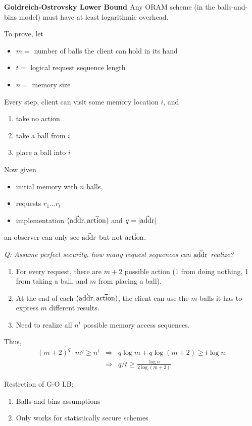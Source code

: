 \textbf{Goldreich-Ostrovsky Lower Bound \cite{goldreich96software}} Any ORAM scheme (in the balls-and-bins model) must have at least logarithmic overhead. 

\noindent To prove, let
\begin{itemize}
  \item $m =$ number of balls the client can hold in its hand
  \item $t =$ logical request sequence length
  \item $n =$ memory size
\end{itemize}

\noindent Every step, client can visit some memory location $i$, and
\begin{enumerate}
  \item take no action
  \item take a ball from $i$
  \item place a ball into $i$
\end{enumerate}

\noindent Now given
\begin{itemize}
  \item initial memory with $n$ balls,
  \item requests $r_1\dots r_t$
  \item implementation $(\vec{\mbox{addr}}, \vec{\mbox{action}})$ and $q = |\vec{\mbox{addr}}|$
\end{itemize}
an observer can only see $\vec{\mbox{addr}}$ but not $\vec{\mbox{action}}$.

\bigskip
\noindent\emph{Q: Assume perfect security, how many request sequences can $\vec{\mbox{addr}}$ realize?}
\begin{enumerate}
  \item For every request, there are $m+2$ possible action (1 from doing nothing, 1 from taking a ball, and $m$ from placing a ball).
  \item At the end of each $(\vec{\mbox{addr}}, \vec{\mbox{action}})$, the client can use the $m$ balls it has to express $m$ different results.
  \item Need to realize all $n^t$ possible memory access sequences.
\end{enumerate}
Thus,
$$
\begin{array}{rcl}
  (m+2)^q \cdot m^q \geq n^t & \Rightarrow & q\log m + q\log(m+2) \geq t\log n \\
  & \Rightarrow & q/t \geq \frac{\log n}{2\log (m+2)}
\end{array}
$$

\noindent Restrction of G-O LB:
\begin{enumerate}
  \item Balls and bins assumptions
  \item Only works for statistically secure schemes
\end{enumerate}

